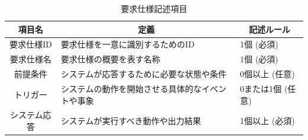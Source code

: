 \begin{table}[tp]
        \caption{要求仕様記述項目}\label{tb:reqspec_item}
        \centering
        \begin{tabular}{c|l|l}
            項目名 & \multicolumn{1}{c|}{定義} & \multicolumn{1}{c}{記述ルール} \\
            \hline
            \hline
            要求仕様ID & 要求仕様を一意に識別するためのID & 1個 (必須) \\
            \hline
            要求仕様名 & 要求仕様の概要を表す名称 & 1個 (必須) \\
            \hline
            前提条件 & システムが応答するために必要な状態や条件 & 0個以上 (任意) \\
            \hline
            トリガー & システムの動作を開始させる具体的なイベントや事象 & 0または1個 (任意) \\
            \hline
            システム応答 & システムが実行すべき動作や出力結果 & 1個以上 (必須) \\
            \hline
        \end{tabular}
    \end{table}

